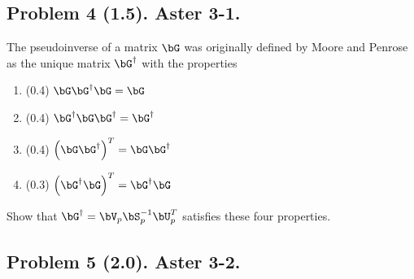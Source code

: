 \documentclass[11pt,titlepage,fleqn]{article}
\begin{document}
\begin{enumerate}
%

\end{enumerate}


\subsection*{Problem 4 (1.5). Aster 3-1.}

The pseudoinverse of a matrix $\bG$ was originally defined by Moore and Penrose as the unique matrix $\bG^{\dagger}$ with the properties
%
\begin{enumerate}
\item (0.4) $\bG\bG^{\dagger}\bG = \bG$
\item (0.4) $\bG^{\dagger}\bG\bG^{\dagger} = \bG^{\dagger}$
\item (0.4) $\left( \bG\bG^{\dagger} \right)^T = \bG\bG^{\dagger}$
\item (0.3) $\left( \bG^{\dagger}\bG \right)^T = \bG^{\dagger}\bG$
\end{enumerate}
%
Show that $\bG^{\dagger} = \bV_p \bS_p^{-1} \bU_p^T$ satisfies these four properties.


\subsection*{Problem 5 (2.0). Aster 3-2.}
\end{document}
